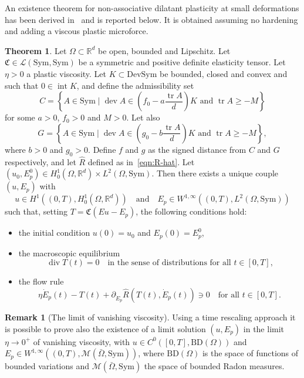 \documentclass[a4paper,10pt,oneside]{amsbook}
\numberwithin{section}{chapter}
\numberwithin{equation}{chapter}
\theoremstyle{definition}
\newtheorem{thm}[prop]{Theorem}
\newtheorem{rmk}[prop]{Remark}
\DeclareMathOperator{\inter}{int}
\DeclareMathOperator{\dev}{dev}
\DeclareMathOperator{\diver}{div}
\DeclareMathOperator{\tr}{tr}
\begin{document}
An existence theorem for non-associative dilatant plasticity at small deformations has been derived in~\cite{morafrancfort} and is reported below. It is obtained assuming no hardening and adding a viscous plastic microforce.
\begin{thm}
\label{thm:existence-non-associative}
Let $\Omega\subset\mathbb{R}^d$ be open, bounded and Lipschitz. Let $\mathfrak{C}\in\mathscr{L}(\text{Sym},\text{Sym})$ be a symmetric and positive definite elasticity tensor. Let $\eta>0$ a plastic viscosity. Let $K\subset\text{DevSym}$ be bounded, closed and convex and such that $0\in\inter K$, and define the admissibility set
\[
C=\left\{A\in\text{Sym}\;|\;\text{$\dev A\in\left(f_0-a\frac{\tr A}{d}\right)K$ and $\tr A\ge-M$}\right\}
\]
for some $a>0$, $f_0>0$ and $M>0$. Let also
\[
G=\left\{A\in\text{Sym}\;|\;\text{$\dev A\in\left(g_0-b\frac{\tr A}{d}\right)K$ and $\tr A\ge-M$}\right\},
\]
where $b>0$ and $g_0>0$. Define  $f$ and $g$ as the signed distance from $C$ and $G$ respectively, and let $\hat{R}$ defined as in~\eqref{eqn:R-hat}. Let $(u_0,E_p^0)\in H^1_0(\Omega,\mathbb{R}^d)\times L^2(\Omega,\text{Sym})$. Then there exists a unique couple $(u,E_p)$ with
\[
u\in H^1((0,T),H^1_0(\Omega,\mathbb{R}^d))\quad\text{and}\quad E_p\in W^{1,\infty}((0,T),L^2(\Omega,\text{Sym}))
\]
such that, setting $T=\mathfrak{C}(Eu-E_p)$, the following conditions hold:
\begin{itemize}
\item[(i)] the initial condition $u(0)=u_0$ and $E_p(0)=E_p^0$,
\item[(ii)] the macroscopic equilibrium
\[
\diver T(t)=0\quad\text{in the sense of distributions for all $t\in[0,T]$,}
\]
\item[(iii)] the flow rule
\[
\eta\dot E_p(t)-T(t)+\partial_{\dot E_p}\hat{R}(T(t),\dot E_p(t))\ni0\quad\text{for all $t\in[0,T]$.}
\]
\end{itemize}
\end{thm}
\begin{rmk}[The limit of vanishing viscosity]
Using a time rescaling approach it is possible to prove also the existence of a limit solution $(u,E_p)$ in the limit $\eta\to0^+$ of vanishing viscosity, with $u\in C^0([0,T],\text{BD}(\Omega))$ and $E_p\in W^{1,\infty}((0,T),\mathscr{M}(\bar\Omega,\text{Sym}))$, where $\text{BD}(\Omega)$ is the space of functions of bounded variations and $\mathscr{M}(\bar\Omega,\text{Sym})$ the space of bounded Radon measures.
\end{rmk}
\end{document}
